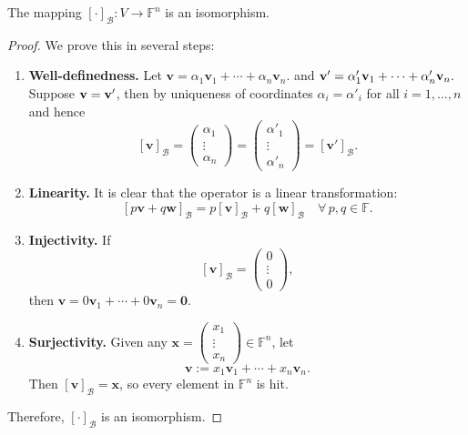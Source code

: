 \begin{theorem}\label{thm: coordinate-isomorphism}
The mapping \([ \cdot ]_{\mathcal{B}} : V \to \mathbb{F}^n\) is an isomorphism.
\end{theorem}

\begin{proof}
We prove this in several steps:

\begin{enumerate}
  \item \textbf{Well-definedness.} Let
   \(
  \mathbf{v}  = \alpha_1 \mathbf{v}_1 + \cdots + \alpha_n \mathbf{v}_n.
  \) and \(
  {\bf v'} = \alpha_1' \mathbf{v}_1 + \cdots + \alpha_n' \mathbf{v}_n.
  \)
  Suppose ${\bf v} = {\bf v'}$,  then by uniqueness of coordinates \(\alpha_i = \alpha'_i\) for all \(i = 1, \ldots, n\) and hence
  \[
  [\mathbf{v}]_{\mathcal{B}} = \begin{pmatrix} \alpha_1 \\ \vdots \\ \alpha_n \end{pmatrix}
  = \begin{pmatrix} \alpha'_1 \\ \vdots \\ \alpha'_n \end{pmatrix} = [\mathbf{v'}]_{\mathcal{B}}.
  \]
 


  \item \textbf{Linearity.} It is clear that the operator is a linear transformation:
  \[
  [p\mathbf{v} + q\mathbf{w}]_{\mathcal{B}} = p[\mathbf{v}]_{\mathcal{B}} + q[\mathbf{w}]_{\mathcal{B}} \quad \forall\, p, q \in \mathbb{F}.
  \]

  \item \textbf{Injectivity.} If
  \[
  [\mathbf{v}]_{\mathcal{B}} = \begin{pmatrix} 0 \\ \vdots \\ 0 \end{pmatrix},
  \]
  then \(\mathbf{v} = 0\mathbf{v}_1 + \cdots + 0\mathbf{v}_n = \mathbf{0}\).

  \item \textbf{Surjectivity.} Given any \(\mathbf{x} = \begin{pmatrix} x_1 \\ \vdots \\ x_n \end{pmatrix} \in \mathbb{F}^n\), let
  \[
  \mathbf{v} := x_1 \mathbf{v}_1 + \cdots + x_n \mathbf{v}_n.
  \]
  Then \([ \mathbf{v} ]_{\mathcal{B}} = \mathbf{x}\), so every element in \(\mathbb{F}^n\) is hit.

\end{enumerate}

Therefore, \([ \cdot ]_{\mathcal{B}}\) is an isomorphism.
\end{proof}

